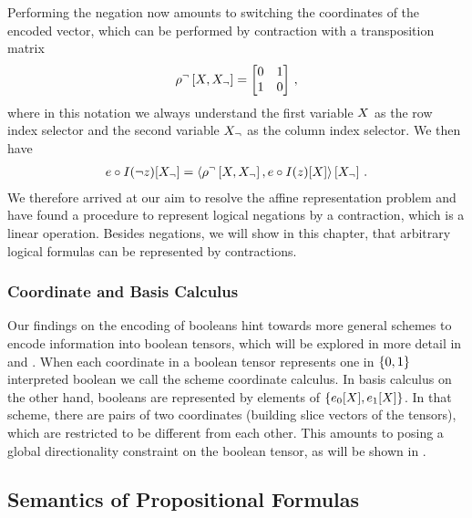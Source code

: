 Performing the negation now amounts to switching the coordinates of the encoded vector, which can be performed by contraction with a transposition matrix
\begin{align*}
	\rho^{\lnot}\left[X,X_{\lnot}\right] = 
	\begin{bmatrix}
		0 & 1 \\
		1 & 0
	\end{bmatrix} \, ,
\end{align*}
where in this notation we always understand the first variable $X$ as the row index selector and the second variable $X_{\lnot}$ as the column index selector.
We then have
\begin{align*}
	e\circ I(\lnot z)[X_{\lnot}] = \left\langle \rho^{\lnot}\left[X,X_{\lnot}\right],e\circ I(z)[X]\right\rangle \left[ X_{\lnot} \right] \, .  
\end{align*}
We therefore arrived at our aim to resolve the affine representation problem and have found a procedure to represent logical negations by a contraction, which is a linear operation.
Besides negations, we will show in this chapter, that arbitrary logical formulas can be represented by contractions.

\subsubsection{Coordinate and Basis Calculus}

Our findings on the encoding of booleans hint towards more general schemes to encode information into boolean tensors, which will be explored in more detail in  and .
When each coordinate in a boolean tensor represents one in $\{0,1\}$ interpreted boolean we call the scheme coordinate calculus.
In basis calculus on the other hand, booleans are represented by elements of $\{e_0[X],e_1[X]\}$.
In that scheme, there are pairs of two coordinates (building slice vectors of the tensors), which are restricted to be different from each other.
This amounts to posing a global directionality constraint on the boolean tensor, as will be shown in .

\subsection{Semantics of Propositional Formulas}


